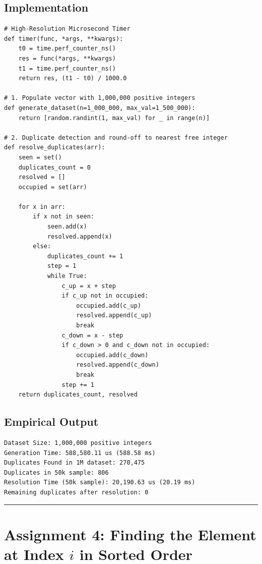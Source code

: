 \documentclass[12pt]{article}
\begin{document}
\subsection{Implementation}
\begin{lstlisting}[style=code]
# High-Resolution Microsecond Timer
def timer(func, *args, **kwargs):
    t0 = time.perf_counter_ns()
    res = func(*args, **kwargs)
    t1 = time.perf_counter_ns()
    return res, (t1 - t0) / 1000.0

# 1. Populate vector with 1,000,000 positive integers
def generate_dataset(n=1_000_000, max_val=1_500_000):
    return [random.randint(1, max_val) for _ in range(n)]

# 2. Duplicate detection and round-off to nearest free integer
def resolve_duplicates(arr):
    seen = set()
    duplicates_count = 0
    resolved = []
    occupied = set(arr)
    
    for x in arr:
        if x not in seen:
            seen.add(x)
            resolved.append(x)
        else:
            duplicates_count += 1
            step = 1
            while True:
                c_up = x + step
                if c_up not in occupied:
                    occupied.add(c_up)
                    resolved.append(c_up)
                    break
                c_down = x - step
                if c_down > 0 and c_down not in occupied:
                    occupied.add(c_down)
                    resolved.append(c_down)
                    break
                step += 1
    return duplicates_count, resolved
\end{lstlisting}

\subsection{Empirical Output}
\begin{lstlisting}[style=output]
Dataset Size: 1,000,000 positive integers
Generation Time: 588,580.11 us (588.58 ms)
Duplicates Found in 1M dataset: 270,475
Duplicates in 50k sample: 806
Resolution Time (50k sample): 20,190.63 us (20.19 ms)
Remaining duplicates after resolution: 0
\end{lstlisting}

\vspace{0.3cm}
\hrule
\vspace{0.3cm}

\section{Assignment 4: Finding the Element at Index $i$ in Sorted Order}
\end{document}
